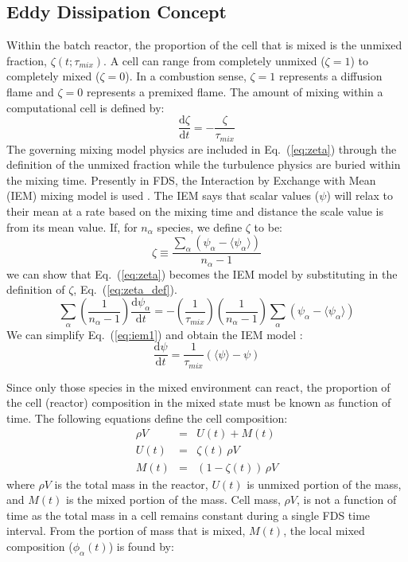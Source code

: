 \subsection{Eddy Dissipation Concept}
\label{sec:EDC} 
Within the batch reactor, the proportion of the cell that is mixed is the unmixed fraction, $\zeta(t;\tau_{mix})$. A cell can range from completely unmixed ($\zeta=1$) to completely mixed ($\zeta=0$). In a combustion sense, $\zeta=1$  represents a diffusion flame and $\zeta=0$ represents a premixed flame. The amount of mixing within a computational cell is defined by:
\begin{equation}\label{eq:zeta}
\frac{\mbox{d}\zeta}{\mbox{d}t}=-\frac{\zeta}{\tau_{mix}}
\end{equation}
The governing mixing model physics are included in Eq.~(\ref{eq:zeta}) through the definition of the unmixed fraction while the turbulence physics are buried within the mixing time. Presently in FDS, the Interaction by Exchange with Mean (IEM) mixing model is used \cite{fox2003}. The IEM says that scalar values ($\psi$) will relax to their mean at a rate based on the mixing time and distance the scale value is from its mean value.  If, for $n_{\alpha}$ species, we define $\zeta$ to be:
\begin{equation}\label{eq:zeta_def}
\zeta \equiv \frac{\displaystyle \sum_{\alpha}(\psi_{\alpha}- \langle \psi_{\alpha} \rangle )}{n_{\alpha} - 1}
\end{equation}
we can show that Eq.~(\ref{eq:zeta}) becomes the IEM model by substituting in the definition of $\zeta$, Eq.~(\ref{eq:zeta_def}).
\begin{equation}\label{eq:iem1}
\displaystyle \sum_{\alpha}\left(\frac{1}{n_{\alpha}-1}\right) \frac{\mbox{d}\psi_{\alpha}}{\mbox{d}t} = - \left(\frac{1}{\tau_{mix}}\right) \left(\frac{1}{n_{\alpha}-1} \right) \displaystyle \sum_{\alpha}(\psi_{\alpha}- \langle \psi_{\alpha} \rangle)
\end{equation}
We can simplify Eq.~(\ref{eq:iem1}) and obtain the IEM model \cite{fox2003}:
\begin{equation}\label{eq:iem2}
\frac{\mbox{d}\psi}{\mbox{d}t} = \frac{1}{\tau_{mix}}(\langle \psi \rangle - \psi)
\end{equation}
      
Since only those species in the mixed environment can react, the proportion of the cell (reactor) composition in the mixed state must be known as function of time. The following equations define the cell composition:
\begin{eqnarray}\label{eq:mixunmix}
\rho V &=& U(t) + M(t) \\
U(t) &=& \zeta(t)\,\rho V \\
M(t) &=& (1-\zeta(t))\,\rho V
\end{eqnarray} 
where $\rho V$ is the total mass in the reactor, $U(t)$ is unmixed portion of the mass, and $M(t)$ is the mixed portion of the mass. Cell mass, $\rho V$, is not a function of time as the total mass in a cell remains constant during a single FDS time interval. From the portion of mass that is mixed, $M(t)$, the local mixed composition ($\phi_{\alpha}(t)$) is found by:

